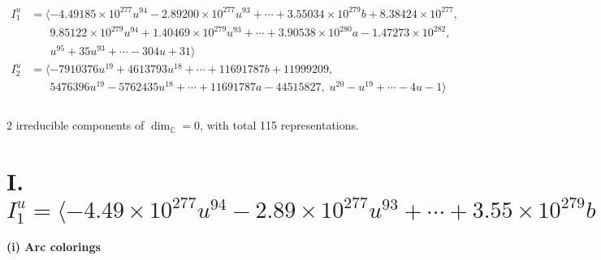 \documentclass[1p]{elsarticle_modified}
\theoremstyle{definition}
\begin{document}
\begin{align*}
I^u_{1}&=\langle 
-4.49185\times10^{277} u^{94}-2.89200\times10^{277} u^{93}+\cdots+3.55034\times10^{279} b+8.38424\times10^{277},\\
\phantom{I^u_{1}}&\phantom{= \langle  }9.85122\times10^{279} u^{94}+1.40469\times10^{279} u^{93}+\cdots+3.90538\times10^{280} a-1.47273\times10^{282},\\
\phantom{I^u_{1}}&\phantom{= \langle  }u^{95}+35 u^{93}+\cdots-304 u+31\rangle \\
I^u_{2}&=\langle 
-7910376 u^{19}+4613793 u^{18}+\cdots+11691787 b+11999209,\\
\phantom{I^u_{2}}&\phantom{= \langle  }5476396 u^{19}-5762435 u^{18}+\cdots+11691787 a-44515827,\;u^{20}- u^{19}+\cdots-4 u-1\rangle \\
\\
\end{align*}
\raggedright * 2 irreducible components of $\dim_{\mathbb{C}}=0$, with total 115 representations.\\
\newpage
\renewcommand{\arraystretch}{1}
\centering \section*{I. $I^u_{1}= \langle -4.49\times10^{277} u^{94}-2.89\times10^{277} u^{93}+\cdots+3.55\times10^{279} b+8.38\times10^{277},\;9.85\times10^{279} u^{94}+1.40\times10^{279} u^{93}+\cdots+3.91\times10^{280} a-1.47\times10^{282},\;u^{95}+35 u^{93}+\cdots-304 u+31 \rangle$}
\flushleft \textbf{(i) Arc colorings}\\
\end{document}
